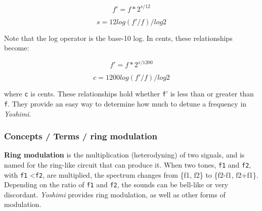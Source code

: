    \[f' = f * 2^{s/12}\]

   \[s = 12 log (f'/f) / log 2\]

   Note that the log operator is the base-10 log.
   In cents, these relationships become:

   \[f' = f * 2^{s/1200}\]

   \[c = 1200 log (f'/f) / log 2\]

   where \texttt{c} is cents.
   These relationships hold whether \texttt{f}' is less than or greater than
   \texttt{f}.  They provide an easy way to determine how much to detune a
   frequency in \textsl{Yoshimi}.

\subsubsection{Concepts / Terms / ring modulation}
\label{subsubsec:concepts_terms_ring_mod}

   \textbf{Ring modulation}
   is the multiplication (heterodyning) of two signals, and is named for the
   ring-like circuit that can produce it.
   When two tones, \texttt{f1} and \texttt{f2}, with 
   \texttt{f1} \textless \texttt{f2}, are multiplied, the spectrum
   changes from \{f1, f2\} to \{f2-f1, f2+f1\}.
   Depending on the ratio of \texttt{f1} and \texttt{f2}, the
   sounds can be bell-like or very discordant.
   \textsl{Yoshimi} provides ring modulation, as well as other forms of
   modulation.

